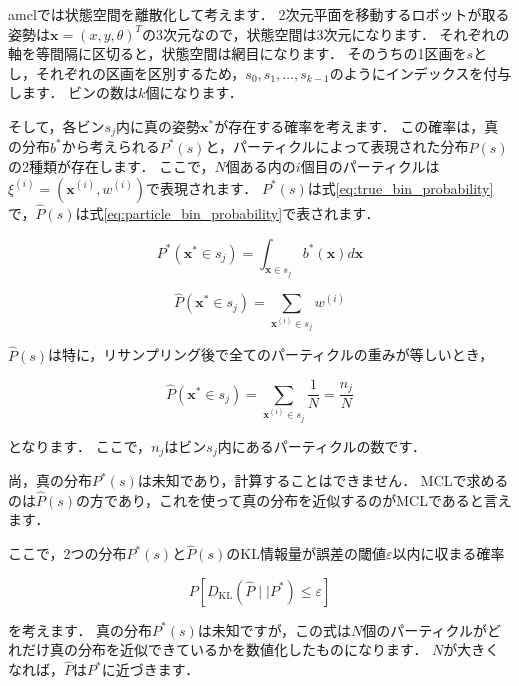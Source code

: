 \documentclass[{../../master}]{subfiles}
\begin{document}
\textsf{amcl}では状態空間を離散化して考えます．
2次元平面を移動するロボットが取る姿勢は$\bm{x} = (x, y, \theta)^T$の3次元なので，状態空間は3次元になります．
それぞれの軸を等間隔に区切ると，状態空間は網目になります．
そのうちの1区画を$s$とし，それぞれの区画を区別するため，$s_0, s_1, \ldots, s_{k-1}$のようにインデックスを付与します．
ビンの数は$k$個になります．

そして，各ビン$s_j$内に真の姿勢$\bm{x}^*$が存在する確率を考えます．
この確率は，真の分布$b^{*}$から考えられる$P^{*}(s)$と，パーティクルによって表現された分布$\hat{P}(s)$の2種類が存在します．
ここで，$N$個ある内の$i$個目のパーティクルは$\xi^{(i)} = (\bm{x}^{(i)}, w^{(i)})$で表現されます．
$P^{*}(s)$は式\ref{eq:true_bin_probability}で，$\hat{P}(s)$は式\ref{eq:particle_bin_probability}で表されます．

\begin{equation}
  P^{*}(\bm{x}^{*} \in s_{j}) = \int_{\bm{x} \in s_{j}} b^{*}(\bm{x})d\bm{x}
  \label{eq:true_bin_probability}
\end{equation}

\begin{equation}
  \hat{P}(\bm{x}^{*} \in s_{j}) = \sum_{\bm{x}^{(i)} \in s_{j}} w^{(i)}
  \label{eq:particle_bin_probability}
\end{equation}

$\hat{P}(s)$は特に，リサンプリング後で全てのパーティクルの重みが等しいとき，

\begin{equation}
  \hat{P}(\bm{x}^{*} \in s_{j}) = \sum_{\bm{x}^{(i)} \in s_{j}} \frac{1}{N} = \frac{n_j}{N}
\end{equation}

\noindent
となります．
ここで，$n_j$はビン$s_j$内にあるパーティクルの数です．

尚，真の分布$P^{*}(s)$は未知であり，計算することはできません．
MCLで求めるのは$\hat{P}(s)$の方であり，これを使って真の分布を近似するのがMCLであると言えます．

ここで，2つの分布$P^{*}(s)$と$\hat{P}(s)$のKL情報量が誤差の閾値$\varepsilon$以内に収まる確率

\begin{equation}
  P[D_{\text{KL}}(\hat{P} \mid\mid P^{*}) \leq \varepsilon]
\end{equation}

\noindent
を考えます．
真の分布$P^{*}(s)$は未知ですが，この式は$N$個のパーティクルがどれだけ真の分布を近似できているかを数値化したものになります．
$N$が大きくなれば，$\hat{P}$は$P^{*}$に近づきます．
\end{document}
